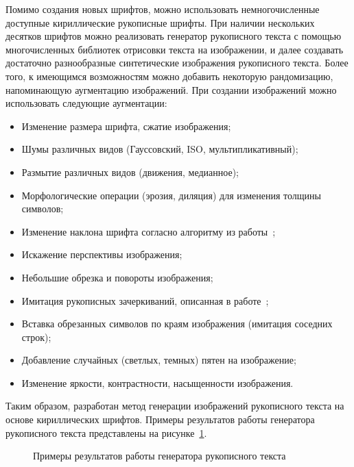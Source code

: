 Помимо создания новых шрифтов, можно использовать немногочисленные доступные кириллические рукописные шрифты.
При наличии нескольких десятков шрифтов можно реализовать генератор рукописного текста с помощью многочисленных библиотек
отрисовки текста на изображении, и далее создавать достаточно разнообразные синтетические изображения рукописного текста.
Более того, к имеющимся возможностям можно добавить некоторую рандомизацию, напоминающую аугментацию изображений.
При создании изображений можно использовать следующие аугментации:
\begin{itemize}
    \item Изменение размера шрифта, сжатие изображения;
    \item Шумы различных видов (Гауссовский, ISO, мультипликативный);
    \item Размытие различных видов (движения, медианное);
    \item Морфологические операции (эрозия, диляция) для изменения толщины символов;
    \item Изменение наклона шрифта согласно алгоритму из работы~\cite{sueiras2021continuous};
    \item Искажение перспективы изображения;
    \item Небольшие обрезка и повороты изображения;
    \item Имитация рукописных зачеркиваний, описанная в работе~\cite{shonenkov2021stackmix};
    \item Вставка обрезанных символов по краям изображения (имитация соседних строк);
    \item Добавление случайных (светлых, темных) пятен на изображение;
    \item Изменение яркости, контрастности, насыщенности изображения.
\end{itemize}

Таким образом, разработан метод генерации изображений рукописного текста на основе кириллических шрифтов.
Примеры результатов работы генератора рукописного текста представлены на рисунке~\ref{fig:synthetic_example}.

\begin{figure}[h!]
    \centering
    \caption{Примеры результатов работы генератора рукописного текста}
    \label{fig:synthetic_example}
\end{figure}


